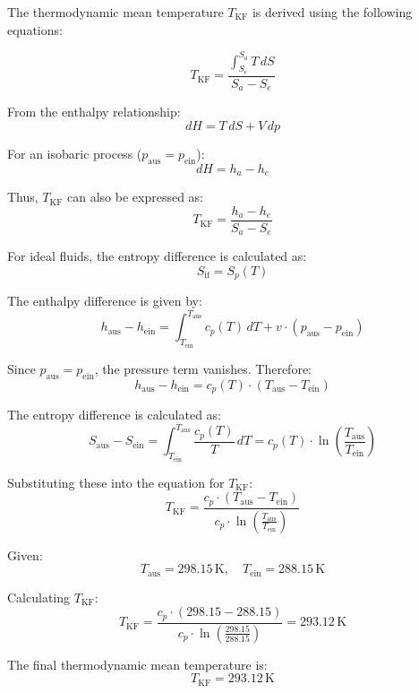 The thermodynamic mean temperature \( T_{\text{KF}} \) is derived using the following equations:  

\[
T_{\text{KF}} = \frac{\int_{S_e}^{S_a} T \, dS}{S_a - S_e}
\]

From the enthalpy relationship:  
\[
dH = T \, dS + V \, dp
\]

For an isobaric process (\( p_{\text{aus}} = p_{\text{ein}} \)):  
\[
dH = h_a - h_e
\]

Thus, \( T_{\text{KF}} \) can also be expressed as:  
\[
T_{\text{KF}} = \frac{h_a - h_e}{S_a - S_e}
\]

For ideal fluids, the entropy difference is calculated as:  
\[
S_{\text{if}} = S_p(T)
\]

The enthalpy difference is given by:  
\[
h_{\text{aus}} - h_{\text{ein}} = \int_{T_{\text{ein}}}^{T_{\text{aus}}} c_p(T) \, dT + v \cdot (p_{\text{aus}} - p_{\text{ein}})
\]

Since \( p_{\text{aus}} = p_{\text{ein}} \), the pressure term vanishes. Therefore:  
\[
h_{\text{aus}} - h_{\text{ein}} = c_p(T) \cdot (T_{\text{aus}} - T_{\text{ein}})
\]

The entropy difference is calculated as:  
\[
S_{\text{aus}} - S_{\text{ein}} = \int_{T_{\text{ein}}}^{T_{\text{aus}}} \frac{c_p(T)}{T} \, dT = c_p(T) \cdot \ln\left(\frac{T_{\text{aus}}}{T_{\text{ein}}}\right)
\]

Substituting these into the equation for \( T_{\text{KF}} \):  
\[
T_{\text{KF}} = \frac{c_p \cdot (T_{\text{aus}} - T_{\text{ein}})}{c_p \cdot \ln\left(\frac{T_{\text{aus}}}{T_{\text{ein}}}\right)}
\]

Given:  
\[
T_{\text{aus}} = 298.15 \, \text{K}, \quad T_{\text{ein}} = 288.15 \, \text{K}
\]

Calculating \( T_{\text{KF}} \):  
\[
T_{\text{KF}} = \frac{c_p \cdot (298.15 - 288.15)}{c_p \cdot \ln\left(\frac{298.15}{288.15}\right)} = 293.12 \, \text{K}
\]  

The final thermodynamic mean temperature is:  
\[
T_{\text{KF}} = 293.12 \, \text{K}
\]